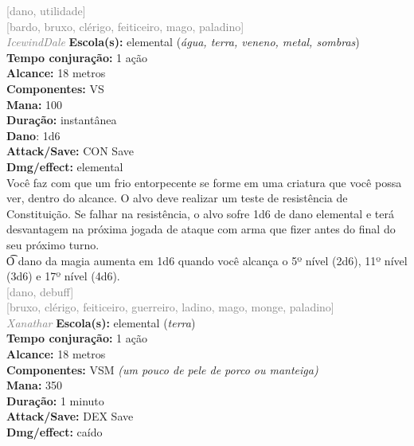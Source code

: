 \documentclass{RPG_Adventure}[2021/10/20]
\begin{document}
{\scriptsize \textcolor{gray}{[dano, utilidade]\\}}
{\scriptsize \textcolor{gray}{[bardo, bruxo, clérigo, feiticeiro, mago, paladino]\\}}
{\tiny \textcolor{gray}{\textit{IcewindDale}}}
{\small \t \textbf{Escola(s):} elemental (\textit{água, terra, veneno, metal, sombras})\\\t \textbf{Tempo conjuração:} 1 ação\\\t \textbf{Alcance:} 18 metros\\\t \textbf{Componentes:} VS\\\t \textbf{Mana:} 100\\\t \textbf{Duração:} instantânea\\\t \textbf{Dano}: 1d6\\\t \textbf{Attack/Save:} CON Save\\\t \textbf{Dmg/effect:} elemental\\}
{\normalsize Você faz com que um frio entorpecente se forme em uma criatura que você possa ver, dentro do alcance. O alvo deve realizar um teste de resistência de Constituição. Se falhar na resistência, o alvo sofre 1d6 de dano elemental e terá desvantagem na próxima jogada de ataque com arma que fizer antes do final do seu próximo turno.\\\t O dano da magia aumenta em 1d6 quando você alcança o 5º nível (2d6), 11º nível (3d6) e 17º nível (4d6).\\}
{\scriptsize \textcolor{gray}{[dano, debuff]\\}}
{\scriptsize \textcolor{gray}{[bruxo, clérigo, feiticeiro, guerreiro, ladino, mago, monge, paladino]\\}}
{\tiny \textcolor{gray}{\textit{Xanathar}}}
{\small \t \textbf{Escola(s):} elemental (\textit{terra})\\\t \textbf{Tempo conjuração:} 1 ação\\\t \textbf{Alcance:} 18 metros\\\t \textbf{Componentes:} VSM \textit{(um pouco de pele de porco ou manteiga)}\\\t \textbf{Mana:} 350\\\t \textbf{Duração:} 1 minuto\\\t \textbf{Attack/Save:} DEX Save\\\t \textbf{Dmg/effect:} caído\\}
\end{document}
